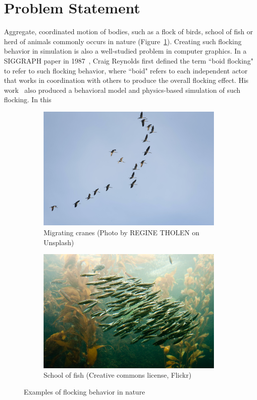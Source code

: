 \section{Problem Statement}
Aggregate, coordinated motion of bodies, such as a flock of birds, school of fish or herd of animals commonly occurs in nature (Figure~\ref{fig:intro}). Creating such flocking behavior in simulation is also a well-studied problem in computer graphics. In a SIGGRAPH paper in 1987~\cite{cr-siggraph}, Craig Reynolds first defined the term ``boid flocking" to refer to such flocking behavior, where ``boid" refers to each independent actor that works in coordination with others to produce the overall flocking effect. His work~\cite{cr-siggraph} also produced a behavioral model and physics-based simulation of such flocking. In this 

\begin{figure}[ht!]
\centering
    \begin{subfigure}[t]{0.45\textwidth}
        \centering
        \includegraphics[scale=0.059]{plots/migrating-cranes.jpg}
        \caption{Migrating cranes (Photo by REGINE THOLEN on Unsplash)}
    \end{subfigure}
    \hfill
    \begin{subfigure}[t]{0.45\textwidth}
        \centering
        \includegraphics[scale=0.26]{plots/school-of-fish.jpg}
        \caption{School of fish (Creative commons license, Flickr)}
    \end{subfigure}
    \caption{Examples of flocking behavior in nature}
    \label{fig:intro}
\end{figure}
